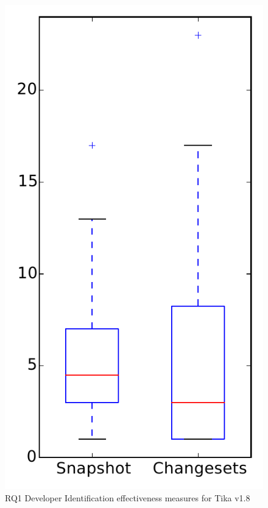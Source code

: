 
\begin{figure}
\centering
\includegraphics[height=0.4\textheight]{figures/dit/rq1_tika}
\caption{RQ1 Developer Identification effectiveness measures for Tika v1.8}
\label{fig:dit:rq1:tika}
\end{figure}
